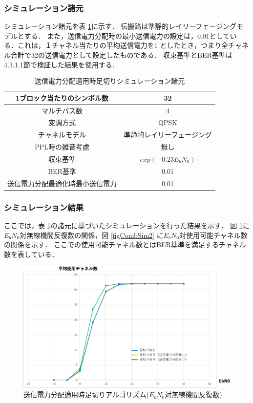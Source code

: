 \subsubsection{シミュレーション諸元}
シミュレーション諸元を表 \ref{tabComb1}に示す．
伝搬路は準静的レイリーフェージングモデルとする．
また，送信電力分配時の最小送信電力の設定は，0.01としている．これは，１チャネル当たりの平均送信電力を1
としたとき，つまり全チャネル合計で32の送信電力として設定したものである．
収束基準とBER基準は4.3.1.1節で検証した結果を使用する．

\begin{table}[ht]
    \begin{tabular}{|c|c|} \hline
        1ブロック当たりのシンボル数 & 32 \\ \hline
        マルチパス数 & 4 \\ \hline
        変調方式 & QPSK \\ \hline
        チャネルモデル & 準静的レイリーフェージング \\ \hline
        PPL時の雑音考慮 & 無し \\ \hline
        収束基準 & $exp(-0.23E_bN_0)$ \\ \hline
        BER基準 & 0.01 \\ \hline
        送信電力分配最適化時最小送信電力 & 0.01 \\ \hline
    \end{tabular}
    \centering
    \caption{送信電力分配適用時足切りシミュレーション諸元}
    \label{tabComb1}
\end{table}

\subsubsection{シミュレーション結果}
ここでは，表 \ref{tabComb1}の諸元に基づいたシミュレーションを行った結果を示す．
図 \ref{figCombSim1}に$E_bN_0$対無線機間反復数の関係，図 \ref{figCombSim2}
に$E_bN_0$対使用可能チャネル数の関係を示す．
ここでの使用可能チャネル数とはBER基準を満足するチャネル数を表している．

\begin{figure}[ht]
    \centering
    \includegraphics[width=0.95\linewidth]{chapter4/figure/CombSim1.eps}
    \caption{送信電力分配適用時足切りアルゴリズム($E_bN_0$対無線機間反復数)}
    \label{figCombSim1}
\end{figure}


